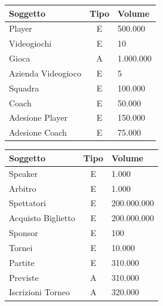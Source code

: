 \documentclass[a4paper,12pt]{report}
\begin{document}
\begin{tabular}{|m{2cm}|c|m{2cm}|}
	\hline\rowcolor{pink}
	Soggetto & Tipo & Volume\\
	\hline\hline
	
	Player & E & 500.000\\
	\hline
	Videogiochi & E & 10\\
	\hline
	Gioca & A & 1.000.000\\
	\hline
	Azienda Videogioco & E & 5\\
	
	
	\hline
	\hline
	
	Squadra & E & 100.000\\
	\hline
	Coach & E & 50.000\\
	\hline
	Adesione Player & E & 150.000\\ 
	\hline
	Adesione Coach & E & 75.000\\ 
	
	\hline
\end{tabular}
\setlength\doublerulesep{0.18cm} %
\begin{tabular}{|m{2cm}|c|m{2cm}|}
	\hline\rowcolor{pink}
	Soggetto & Tipo & Volume\\
	\hline\hline
	Speaker & E & 1.000\\
	\hline
	Arbitro & E & 1.000\\
	\hline
	Spettatori & E & 200.000.000\\
	\hline
	Acquisto Biglietto & E & 200.000.000\\ 
	\hline
	Sponsor & E & 100\\
	
	\hline\hline
	
	Tornei & E & 10.000\\
	\hline
	Partite & E & 310.000\\
	\hline
	Previste & A & 310.000\\ 
	\hline
	Iscrizioni Torneo & A & 320.000\\ 
	\hline
	
	
\end{tabular}
\end{document}
